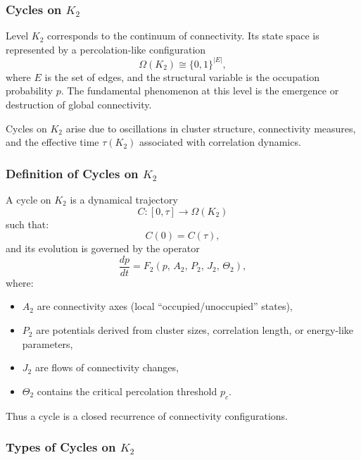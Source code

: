
\subsubsection{Cycles on \texorpdfstring{$K_2$}{K_2}}
\label{sec:cycles-k2}

Level $K_2$ corresponds to the continuum of connectivity.
Its state space is represented by a percolation-like configuration
\[
  \Omega(K_2) \cong \{0,1\}^{|E|},
\]
where $E$ is the set of edges, and the structural variable is the
occupation probability $p$.
The fundamental phenomenon at this level is the emergence or destruction
of global connectivity.

Cycles on $K_2$ arise due to oscillations in cluster structure, 
connectivity measures, and the effective time $\tau(K_2)$ associated
with correlation dynamics.

\subsubsection{Definition of Cycles on \texorpdfstring{$K_2$}{K_2}}

A cycle on $K_2$ is a dynamical trajectory
\[
  C:[0,\tau]\to\Omega(K_2)
\]
such that:
\[
  C(0)=C(\tau),
\]
and its evolution is governed by the operator
\[
  \frac{dp}{dt}
  = F_2(p,\, A_2,\, P_2,\, J_2,\, \Theta_2),
\]
where:

\begin{itemize}
  \item $A_2$ are connectivity axes (local ``occupied/unoccupied'' states),
  \item $P_2$ are potentials derived from cluster sizes, correlation length,
        or energy-like parameters,
  \item $J_2$ are flows of connectivity changes,
  \item $\Theta_2$ contains the critical percolation threshold $p_c$.
\end{itemize}

Thus a cycle is a closed recurrence of connectivity configurations.

\subsubsection{Types of Cycles on \texorpdfstring{$K_2$}{K_2}}

